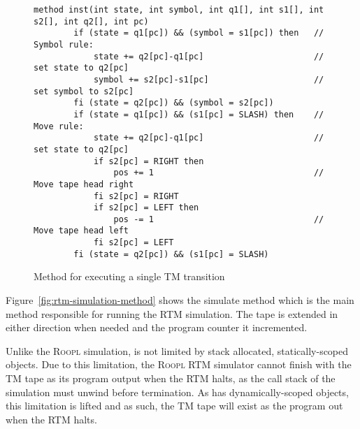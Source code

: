 \begin{figure}[ht]
    \centering
    \begin{lstlisting}[style = basic, language = roopl]
    method inst(int state, int symbol, int q1[], int s1[], int s2[], int q2[], int pc)
        if (state = q1[pc]) && (symbol = s1[pc]) then   // Symbol rule:
            state += q2[pc]-q1[pc]                      // set state to q2[pc]
            symbol += s2[pc]-s1[pc]                     // set symbol to s2[pc]
        fi (state = q2[pc]) && (symbol = s2[pc])
        if (state = q1[pc]) && (s1[pc] = SLASH) then    // Move rule:
            state += q2[pc]-q1[pc]                      // set state to q2[pc]
            if s2[pc] = RIGHT then
                pos += 1                                // Move tape head right
            fi s2[pc] = RIGHT
            if s2[pc] = LEFT then
                pos -= 1                                // Move tape head left
            fi s2[pc] = LEFT
        fi (state = q2[pc]) && (s1[pc] = SLASH)
    \end{lstlisting}
    \caption{Method for executing a single TM transition}
    \label{fig:rtm-instruction-method}
\end{figure}

Figure~\ref{fig:rtm-simulation-method} shows the simulate method which is the main method responsible for running the RTM simulation. The tape is extended in either direction when needed and the program counter it incremented.

Unlike the \textsc{Roopl} simulation, \rooplpp is not limited by stack allocated, statically-scoped objects. Due to this limitation, the \textsc{Roopl} RTM simulator cannot finish with the TM tape as its program output when the RTM halts, as the call stack of the simulation must unwind before termination. As \rooplpp has dynamically-scoped objects, this limitation is lifted and as such, the TM tape will exist as the program out when the RTM halts.

